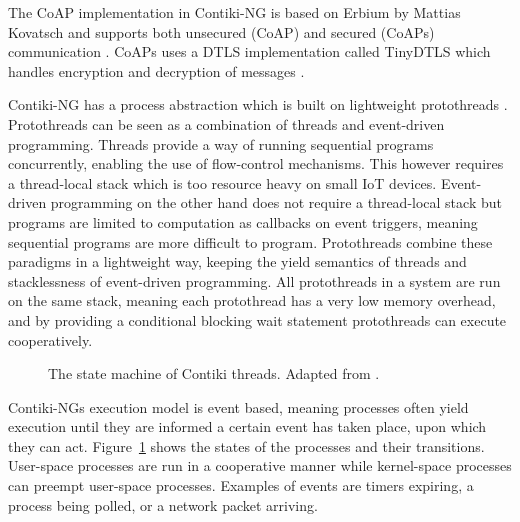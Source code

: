 \documentclass[0-thesis.tex]{subfiles}
\begin{document}
The CoAP implementation in Contiki-NG is based on Erbium by Mattias Kovatsch and supports
both unsecured (CoAP) and secured (CoAPs) communication \parencite{low-power-coap}. CoAPs
uses a DTLS implementation called TinyDTLS which handles encryption and decryption of
messages \parencite{tinydtls-github}.

Contiki-NG has a process abstraction which is built on lightweight protothreads
\parencite{protothreads}. Protothreads can be seen as a combination of threads and
event-driven programming. Threads provide a way of running sequential programs
concurrently, enabling the use of flow-control mechanisms. This however requires a
thread-local stack which is too resource heavy on small IoT devices. Event-driven
programming on the other hand does not require a thread-local stack but programs are
limited to computation as callbacks on event triggers, meaning sequential programs are
more difficult to program. Protothreads combine these paradigms in a lightweight way,
keeping the yield semantics of threads and stacklessness of event-driven programming. All
protothreads in a system are run on the same stack, meaning each protothread has a very
low memory overhead, and by providing a conditional blocking wait statement protothreads
can execute cooperatively.

\begin{figure}
    \caption{The state machine of Contiki threads. Adapted from \parencite{contiki-multithreading}.}
    \label{fig:state-machine}
\end{figure}

Contiki-NGs execution model is event based, meaning processes often yield execution until
they are informed a certain event has taken place, upon which they can act.
Figure~\ref{fig:state-machine} shows the states of the processes and their transitions.
User-space processes are run in a cooperative manner while kernel-space processes can
preempt user-space processes. Examples of events are timers expiring, a process being
polled, or a network packet arriving.
\end{document}
